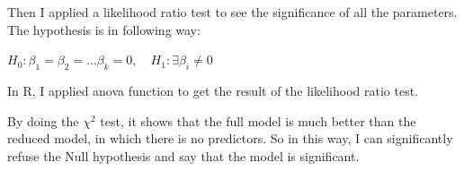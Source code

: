 \documentclass[letterpaper,12pt]{article}
\begin{document}
Then I applied a likelihood ratio test to see the significance of all the parameters. The hypothesis is in following way:
\begin{center}
$H_{0}: \beta_{1} = \beta_{2}=... \beta_{k} = 0, \quad H_{1}: \exists \beta_{i} \neq 0$
\end{center}
In R, I applied anova function to get the result of the likelihood ratio test. 


\noindent By doing the $\chi^2$ test, it shows that the full model is much better than the reduced model, in which there is no predictors. So in this way, I can significantly refuse the Null hypothesis and say that the model is significant.
\end{document}
